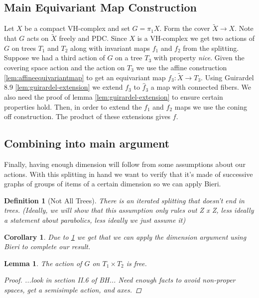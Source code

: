 \documentclass{article}
\theoremstyle{mystyle}
\newtheorem{lem}[thm]{Lemma}
\newtheorem{defn}[thm]{Definition}
\newtheorem*{cor*}{Corollary}
\theoremstyle{remark}
\begin{document}
\subsection{Main Equivariant Map Construction}
Let \(X\) be a compact VH-complex and set \(G= \pi_{1} X\). Form the cover \(\widetilde{X} \to X\). Note that \(G\) acts on \(\widetilde X\) freely and PDC. Since \(X\) is a VH-complex we get two actions of \(G\) on trees \(T_{1}\) and \(T_{2}\) along with invariant maps \(f_{1}\) and \(f_{2}\) from the splitting. Suppose we had a third action of \(G\) on a tree \(T_{3}\) with property {\em nice}. Given the covering space action and the action on \(T_{3}\) we use the affine construction \ref{lem:affineequivariantmap} to get an equivariant map \(f_{3} : \widetilde X \to T_{3}\). Using Guirardel 8.9 \ref{lem:guirardel-extension} we extend \(f_{3}\) to \(\widehat f_{3}\) a map with connected fibers. We also need the proof of lemma \ref{lem:guirardel-extension} to ensure certain properties hold. Then, in order to extend the \(f_{1}\) and \(f_{2}\) maps we use the coning off construction. The product of these extensions gives \(f\).
    
\subsection{Combining into main argument}

Finally, having enough dimension will follow from some assumptions about our actions.
With this splitting in hand we want to verify that it's made of successive graphs of groups of items of a certain dimension so we can apply Bieri.

\begin{defn}
    [Not All Trees]
    \label{def:notalltrees} 
    There is an iterated splitting that doesn't end in trees. (Ideally, we will show that this assumption only rules out Z x Z, less ideally a statement about parabolics, less ideally we just assume it)
\end{defn}

\begin{cor*}
    Due to \ref{def:notalltrees} we get that we can apply the dimension argument using Bieri to complete our result.
\end{cor*}

\begin{lem}
    The action of \(G\) on \(T_1 \times T_{2} \) is free.
    \begin{proof}
        ...look in section II.6 of BH... Need enough facts to avoid non-proper spaces, get a semisimple action, and axes.
    \end{proof}
\end{lem}
\end{document}
